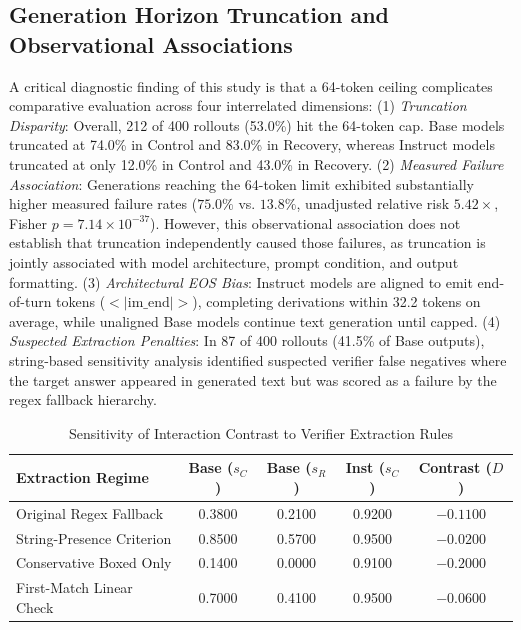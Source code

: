 \documentclass[conference]{IEEEtran}
\begin{document}
\subsection{Generation Horizon Truncation and Observational Associations}
A critical diagnostic finding of this study is that a 64-token ceiling complicates comparative evaluation across four interrelated dimensions:
(1) \textit{Truncation Disparity}: Overall, 212 of 400 rollouts (53.0\%) hit the 64-token cap. Base models truncated at 74.0\% in Control and 83.0\% in Recovery, whereas Instruct models truncated at only 12.0\% in Control and 43.0\% in Recovery.
(2) \textit{Measured Failure Association}: Generations reaching the 64-token limit exhibited substantially higher measured failure rates ($75.0\%$ vs. $13.8\%$, unadjusted relative risk $5.42\times$, Fisher $p = 7.14 \times 10^{-37}$). However, this observational association does not establish that truncation independently caused those failures, as truncation is jointly associated with model architecture, prompt condition, and output formatting.
(3) \textit{Architectural EOS Bias}: Instruct models are aligned to emit end-of-turn tokens ($<|\text{im\_end}|>$), completing derivations within 32.2 tokens on average, while unaligned Base models continue text generation until capped.
(4) \textit{Suspected Extraction Penalties}: In 87 of 400 rollouts (41.5\% of Base outputs), string-based sensitivity analysis identified suspected verifier false negatives where the target answer appeared in generated text but was scored as a failure by the regex fallback hierarchy.

\begin{table}[htbp]
\caption{Sensitivity of Interaction Contrast to Verifier Extraction Rules}
\label{tab:verifier_sensitivity}
\centering
\small
\begin{tabularx}{\columnwidth}{Xcccc}
\toprule
\textbf{Extraction Regime} & \textbf{Base ($s_C$)} & \textbf{Base ($s_R$)} & \textbf{Inst ($s_C$)} & \textbf{Contrast ($D$)} \\
\midrule
Original Regex Fallback & 0.3800 & 0.2100 & 0.9200 & \textbf{$-0.1100$} \\
String-Presence Criterion & 0.8500 & 0.5700 & 0.9500 & \textbf{$-0.0200$} \\
Conservative Boxed Only & 0.1400 & 0.0000 & 0.9100 & \textbf{$-0.2000$} \\
First-Match Linear Check & 0.7000 & 0.4100 & 0.9500 & \textbf{$-0.0600$} \\
\bottomrule
\end{tabularx}
\vspace{-1.5mm}
\end{table}
\end{document}
